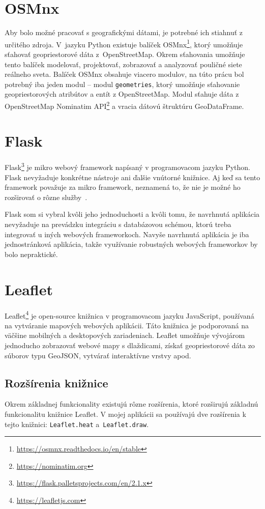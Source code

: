\section{OSMnx}
Aby bolo možné pracovať s geografickými dátami, je potrebné ich stiahnuť z určitého zdroja. V~jazyku Python existuje balíček OSMnx\footnote{\url{https://osmnx.readthedocs.io/en/stable}}, ktorý umožňuje sťahovať geopriestorové dáta z~OpenStreetMap. Okrem sťahovania umožňuje tento balíček modelovať, projektovať, zobrazovať a analyzovať pouličné siete reálneho sveta. Balíček OSMnx obsahuje viacero modulov, na túto prácu bol potrebný iba jeden modul \--- modul \texttt{geometries}, ktorý  umožňuje sťahovanie geopriestorových atribútov a entít z OpenStreetMap. Modul sťahuje dáta z OpenStreetMap Nominatim API\footnote{\url{https://nominatim.org}} a vracia dátovú štruktúru GeoDataFrame.


\section{Flask}
Flask\footnote{\url{https://flask.palletsprojects.com/en/2.1.x}} je mikro webový framework napísaný v programovacom jazyku Python. Flask nevyžaduje konkrétne nástroje ani ďalšie vnútorné knižnice. Aj keď sa tento framework považuje za mikro framework, neznamená to, že nie je možné ho rozširovať o rôzne služby~\cite{Oreilly2014Flask}.

Flask som si vybral kvôli jeho jednoduchosti a kvôli tomu, že navrhnutá aplikácia nevyžaduje na prevádzku integráciu s databázovou schémou, ktorú treba integrovať u iných webových frameworkoch. Navyše navrhnutá aplikácia je iba jednostránková aplikácia, takže využívanie robustných webových frameworkov by bolo nepraktické.


\section{Leaflet}
Leaflet\footnote{\url{https://leafletjs.com}} je open-source knižnica v programovacom jazyku JavaScript, používaná na vytváranie mapových webových aplikácii. Táto knižnica je podporovaná na väčšine mobilných a desktopových zariadeniach. Leaflet umožňuje vývojárom jednoducho zobrazovať webové mapy s dlaždicami, získať geopriestorové dáta zo súborov typu GeoJSON, vytvárať interaktívne vrstvy apod.

\subsection{Rozšírenia knižnice}
Okrem základnej funkcionality existujú rôzne rozšírenia, ktoré rozširujú základnú funkcionalitu knižnice Leaflet. V mojej aplikácii sa používajú dve rozšírenia k tejto knižnici: \texttt{Leaflet.heat} a~\texttt{Leaflet.draw}. 


